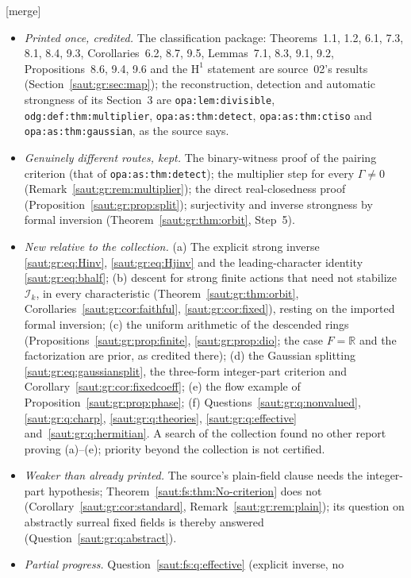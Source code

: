 \documentclass[11pt]{article}
\theoremstyle{definition}
\theoremstyle{remark}
\newcommand{\R}{\mathbb R}
\newcommand{\lbl}[1]{\nolinkurl{#1}}%
\newcommand{\Ineg}{\mathcal I}
\newcommand{\mergetag}{\textup{[merge]}}
\numberwithin{equation}{section}
\begin{document}
\mergetag
\begin{itemize}
\item \emph{Printed once, credited.} The classification package: Theorems~1.1, 1.2, 6.1,
7.3, 8.1, 8.4, 9.3, Corollaries~6.2, 8.7, 9.5, Lemmas~7.1, 8.3, 9.1, 9.2, Propositions~8.6,
9.4, 9.6 and the $\mathrm H^1$ statement are source~02's results
(Section~\ref{saut:gr:sec:map}); the reconstruction, detection and automatic strongness
of its Section~3 are \lbl{opa:lem:divisible}, \lbl{odg:def:thm:multiplier},
\lbl{opa:as:thm:detect}, \lbl{opa:as:thm:ctiso} and \lbl{opa:as:thm:gaussian}, as the
source says.
\item \emph{Genuinely different routes, kept.} The binary-witness proof of the pairing
criterion (that of \lbl{opa:as:thm:detect}); the multiplier step for every $\Gamma\ne0$
(Remark~\ref{saut:gr:rem:multiplier}); the direct real-closedness proof
(Proposition~\ref{saut:gr:prop:split}); surjectivity and inverse strongness by formal
inversion (Theorem~\ref{saut:gr:thm:orbit}, Step~5).
\item \emph{New relative to the collection.} (a) The explicit strong inverse
\eqref{saut:gr:eq:Hinv}, \eqref{saut:gr:eq:Hjinv} and the leading-character identity
\eqref{saut:gr:eq:bhalf}; (b) descent for strong finite actions that need not stabilize
$\Ineg_k$, in every characteristic (Theorem~\ref{saut:gr:thm:orbit},
Corollaries~\ref{saut:gr:cor:faithful}, \ref{saut:gr:cor:fixed}), resting on the imported
formal inversion; (c) the uniform arithmetic of the descended rings
(Propositions~\ref{saut:gr:prop:finite}, \ref{saut:gr:prop:dio}; the case $F=\R$ and the
factorization are prior, as credited there); (d) the Gaussian splitting
\eqref{saut:gr:eq:gaussiansplit}, the three-form integer-part criterion and
Corollary~\ref{saut:gr:cor:fixedcoeff}; (e) the flow example of
Proposition~\ref{saut:gr:prop:phase}; (f) Questions~\ref{saut:gr:q:nonvalued},
\ref{saut:gr:q:charp}, \ref{saut:gr:q:theories}, \ref{saut:gr:q:effective}
and~\ref{saut:gr:q:hermitian}. A search of the collection found no other report proving
(a)--(e); priority beyond the collection is not certified.
\item \emph{Weaker than already printed.} The source's plain-field clause needs the
integer-part hypothesis; Theorem~\ref{saut:fs:thm:No-criterion} does not
(Corollary~\ref{saut:gr:cor:standard}, Remark~\ref{saut:gr:rem:plain}); its question on
abstractly surreal fixed fields is thereby answered
(Question~\ref{saut:gr:q:abstract}).
\item \emph{Partial progress.} Question~\ref{saut:fs:q:effective} (explicit inverse, no

\end{itemize}
\end{document}
